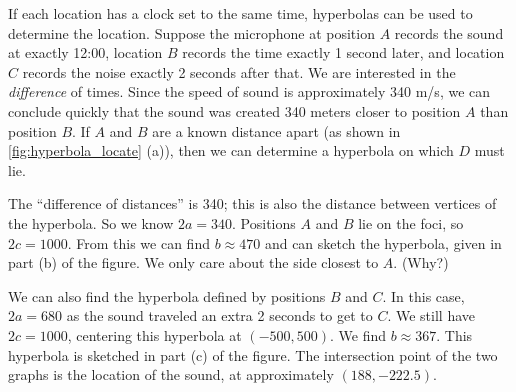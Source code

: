 {

If each location has a clock set to the same time, hyperbolas can be used to determine the location. Suppose the microphone at position $A$ records the sound at exactly 12:00, location $B$ records the time exactly 1 second later, and location $C$ records the noise exactly 2 seconds after that. We are interested in the \emph{difference} of times. Since the speed of sound is approximately 340 m/s, we can conclude quickly that the sound was created 340 meters closer to position $A$ than position $B$. If $A$ and $B$ are a known distance apart (as shown in \autoref{fig:hyperbola_locate} (a)), then we can determine a hyperbola on which $D$ must lie. 

The ``difference of distances'' is 340; this is also the distance between vertices of the hyperbola. So we know $2a=340$. Positions $A$ and $B$ lie on the foci, so $2c=1000$. From this we can find $b\approx 470$ and can sketch the hyperbola, given in part (b) of the figure. We only care about the side closest to $A$. (Why?)

We can also find the hyperbola defined by positions $B$ and $C$. In this case, $2a = 680$ as the sound traveled an extra 2 seconds to get to $C$. We still have $2c=1000$, centering this hyperbola at $(-500,500)$. We find $b\approx 367$. This hyperbola is sketched in part (c) of the figure. The intersection point of the two graphs is the location of the sound, at approximately $(188,-222.5)$.

}
